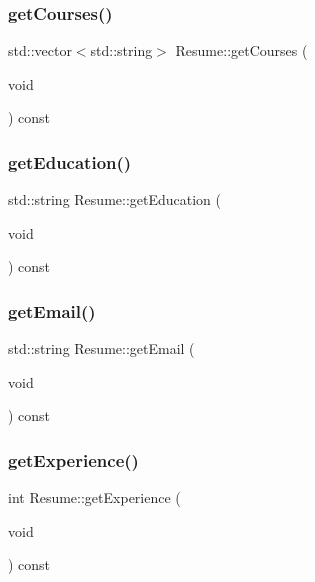 \subsubsection{\texorpdfstring{get\+Courses()}{getCourses()}}
{\footnotesize\ttfamily std\+::vector$<$std\+::string$>$ Resume\+::get\+Courses (\begin{DoxyParamCaption}\item[{void}]{ }\end{DoxyParamCaption}) const\hspace{0.3cm}{\ttfamily [inline]}}

\hypertarget{class_resume_af57d4658748a7e718d546594bfd74450}{}\label{class_resume_af57d4658748a7e718d546594bfd74450} 
\subsubsection{\texorpdfstring{get\+Education()}{getEducation()}}
{\footnotesize\ttfamily std\+::string Resume\+::get\+Education (\begin{DoxyParamCaption}\item[{void}]{ }\end{DoxyParamCaption}) const\hspace{0.3cm}{\ttfamily [inline]}}

\hypertarget{class_resume_af38cb080447a7c96b20026999fd330ee}{}\label{class_resume_af38cb080447a7c96b20026999fd330ee} 
\subsubsection{\texorpdfstring{get\+Email()}{getEmail()}}
{\footnotesize\ttfamily std\+::string Resume\+::get\+Email (\begin{DoxyParamCaption}\item[{void}]{ }\end{DoxyParamCaption}) const\hspace{0.3cm}{\ttfamily [inline]}}

\hypertarget{class_resume_ad8abe2f52e3a5b4f730c87ab297ea99a}{}\label{class_resume_ad8abe2f52e3a5b4f730c87ab297ea99a} 
\subsubsection{\texorpdfstring{get\+Experience()}{getExperience()}}
{\footnotesize\ttfamily int Resume\+::get\+Experience (\begin{DoxyParamCaption}\item[{void}]{ }\end{DoxyParamCaption}) const\hspace{0.3cm}{\ttfamily [inline]}}

